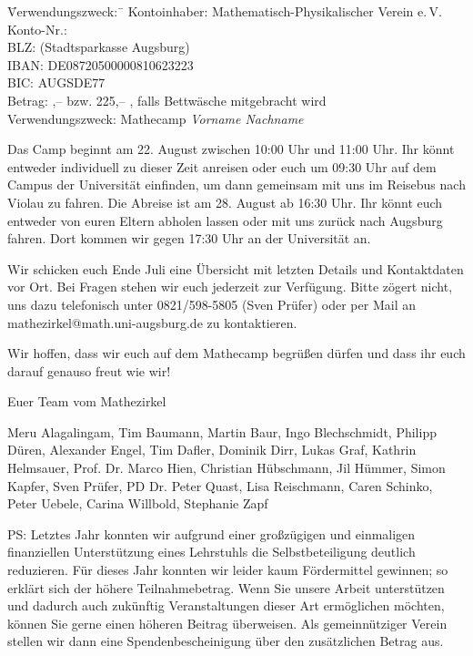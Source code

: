\documentclass[12pt]{zettel}
\begin{document}
\vspace{-0.7em}
\begin{tabbing}
  \qquad\quad \= Verwendungszweck:\, \= \kill
  \> Kontoinhaber: \> Mathematisch-Physikalischer Verein e.\,V. \\
  \> Konto-Nr.:  \\
  \> BLZ:  (Stadtsparkasse Augsburg) \\
  \> IBAN: \> DE08720500000810623223 \\
  \> BIC: \> AUGSDE77 \\
  \> Betrag: ,-- \texteuro{} bzw. 225,-- \texteuro, falls Bettwäsche
  mitgebracht wird \\
  \> Verwendungszweck: \> Mathecamp \emph{Vorname Nachname}
\end{tabbing}
\vspace{-0.7em}

Das Camp beginnt am 22. August zwischen 10:00 Uhr und 11:00 Uhr. Ihr könnt
entweder individuell zu dieser Zeit anreisen oder euch um 09:30 Uhr auf dem Campus der
Universität einfinden, um dann gemeinsam mit uns im Reisebus nach Violau zu fahren.
Die Abreise ist am 28. August ab 16:30 Uhr. Ihr könnt euch entweder von euren
Eltern abholen lassen oder mit uns zurück nach Augsburg fahren. Dort kommen wir
gegen 17:30 Uhr an der Universität an.

Wir schicken euch Ende Juli eine Übersicht mit
letzten Details und Kontaktdaten vor Ort. Bei Fragen stehen wir euch jederzeit
zur Verfügung. Bitte zögert nicht, uns dazu telefonisch unter 0821/598-5805
(Sven Prüfer) oder per Mail an \textsf{mathezirkel@math.uni-augsburg.de} zu kontaktieren.

Wir hoffen, dass wir
euch auf dem Mathecamp begrüßen dürfen und dass
ihr euch darauf genauso freut wie wir!

\vspace{2em}

Euer Team vom Mathezirkel

{\small Meru Alagalingam, Tim Baumann, Martin Baur, Ingo Blechschmidt, Philipp Düren,
Alexander Engel, Tim Dafler, Dominik Dirr, Lukas Graf, Kathrin Helmsauer, Prof. Dr. Marco Hien,
Christian Hübschmann, Jil Hümmer, Simon Kapfer, Sven Prüfer, PD Dr. Peter Quast,
Lisa Reischmann, Caren Schinko, Peter Uebele, Carina Willbold,
Stephanie Zapf}

\vfill

PS: Letztes Jahr konnten wir aufgrund einer großzügigen und einmaligen
finanziellen Unterstützung eines Lehrstuhls die Selbstbeteiligung deutlich
reduzieren. Für dieses Jahr konnten wir leider kaum Fördermittel
gewinnen; so erklärt sich der höhere Teilnahmebetrag.
Wenn Sie unsere Arbeit unterstützen
und dadurch auch zukünftig Veranstaltungen dieser Art ermöglichen möchten,
können Sie gerne einen höheren Beitrag überweisen. Als gemeinnütziger Verein
stellen wir dann eine Spendenbescheinigung über den zusätzlichen
Betrag aus.
\end{document}
